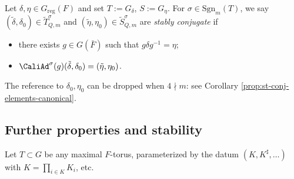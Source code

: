 \documentclass[a4paper,10pt]{article}
\begin{document}
\begin{definition}\label{def:st-conj-elements}
	Let $\delta, \eta \in G_\mathrm{reg}(F)$ and set $T := G_\delta$, $S := G_\eta$. For $\sigma \in \mathrm{Sgn}_m(T)$, we say $(\tilde{\delta}, \delta_0) \in \tilde{T}^\sigma_{Q,m}$ and $(\tilde{\eta}, \eta_0) \in \tilde{S}^\sigma_{Q,m}$ are \emph{stably conjugate} if
	\begin{itemize}
		\item there exists $g \in G(\bar{F})$ such that $g\delta g^{-1} = \eta$;
		\item $\CaliAd^\sigma(g)(\tilde{\delta}, \delta_0) = (\tilde{\eta}, \eta_0)$.
	\end{itemize}
\end{definition}
The reference to $\delta_0, \eta_0$ can be dropped when $4 \nmid m$: see Corollary \ref{prop:st-conj-elements-canonical}.


\subsection{Further properties and stability}\label{sec:further-properties}
Let $T \subset G$ be any maximal $F$-torus, parameterized by the datum $(K, K^\sharp, \ldots)$ with $K = \prod_{i \in K} K_i$, etc.
\end{document}
